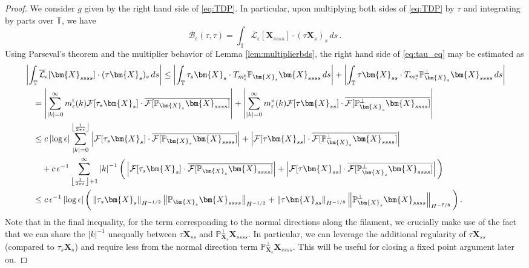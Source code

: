 \documentclass[11pt,reqno]{amsart}
\newcommand{\T}{\mathbb{T}}
\renewcommand{\P}{\mathbb{P}}
\newcommand{\X}{\bm{X}}
\newcommand{\abs}[1]{\left\lvert #1 \right\rvert}
\newcommand{\norm}[1]{\left\lVert #1 \right\rVert}
\newcommand{\floor}[1]{\left\lfloor #1 \right\rfloor}
\newcommand{\mc}[1]{\mathcal{#1}}
\numberwithin{equation}{section}
\theoremstyle{definition}
\begin{document}
\begin{proof}
We consider $g$ given by the right hand side of \eqref{eq:TDP}. In particular, upon multiplying both sides of \eqref{eq:TDP} by $\tau$ and integrating by parts over $\T$, we have 
\begin{equation}\label{eq:tau_eq}
  \mc{B}_\epsilon(\tau,\tau) = \int_\T\overline{\mc{L}}_\epsilon[\X_{ssss}]\cdot(\tau\X_s)_s\,ds\,.
\end{equation}
%
%
Using Parseval's theorem and the multiplier behavior of Lemma \ref{lem:multiplierbds}, the right hand side of \eqref{eq:tau_eq} may be estimated as 
\begin{equation}
\begin{aligned}
  &\abs{\int_\T\overline{\mc{L}}_\epsilon[\X_{ssss}]\cdot(\tau\X_s)_s\,ds} \le \abs{\int_\T \tau_s\X_s\cdot T_{m_\epsilon^{\rm t}}\P_{\X_s}\X_{ssss}\,ds} + \abs{\int_\T \tau\X_{ss}\cdot T_{m_\epsilon^{\rm n}}\P_{\X_s}^\perp\X_{ssss}\,ds}\\
  &\quad =\abs{\sum_{\abs{k}=0}^\infty m_\epsilon^{\rm t}(k)\mc{F}[\tau_s\X_s]\cdot \overline{\mc{F}[\P_{\X_s}\X_{ssss}]} }
   + \abs{\sum_{\abs{k}=0}^\infty m_\epsilon^{\rm n}(k)\mc{F}[\tau\X_{ss}]\cdot \overline{\mc{F}[\P_{\X_s}^\perp\X_{ssss}]} }\\
  &\quad \le c\abs{\log\epsilon}\sum_{\abs{k}=0}^{\floor{\frac{1}{2\pi\epsilon}}} \abs{\mc{F}[\tau_s\X_s]\cdot \overline{\mc{F}[\P_{\X_s}\X_{ssss}]} } + \abs{\mc{F}[\tau\X_{ss}]\cdot \overline{\mc{F}[\P_{\X_s}^\perp\X_{ssss}]} }\\
  &\qquad + c\,\epsilon^{-1}\sum_{\floor{\frac{1}{2\pi\epsilon}}+1}^\infty\abs{k}^{-1}\bigg( \abs{\mc{F}[\tau_s\X_s]\cdot \overline{\mc{F}[\P_{\X_s}\X_{ssss}]} } + \abs{\mc{F}[\tau\X_{ss}]\cdot \overline{\mc{F}[\P_{\X_s}^\perp\X_{ssss}]} }\bigg)\\
  &\quad \le c\,\epsilon^{-1}\abs{\log\epsilon}\bigg(\norm{\tau_s\X_s}_{H^{-1/2}}\norm{\P_{\X_s}\X_{ssss}}_{H^{-1/2}} + \norm{\tau\X_{ss}}_{H^{-1/8}}\norm{\P_{\X_s}^\perp\X_{ssss}}_{H^{-7/8}}\bigg)\,.
\end{aligned}
\end{equation}
%
Note that in the final inequality, for the term corresponding to the normal directions along the filament, we crucially make use of the fact that we can share the $\abs{k}^{-1}$ unequally between $\tau\X_{ss}$ and $\P_{\X_s}^\perp\X_{ssss}$. In particular, we can leverage the additional regularity of $\tau\X_{ss}$ (compared to $\tau_s\X_s$) and require less from the normal direction term $\P_{\X_s}^\perp\X_{ssss}$. This will be useful for closing a fixed point argument later on. 



\end{proof}
\end{document}
